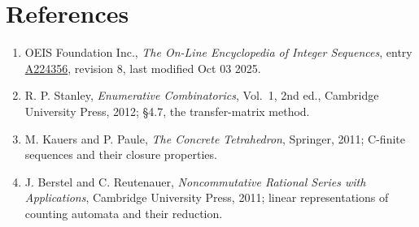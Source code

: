 \documentclass[11pt]{article}
\theoremstyle{definition}
\begin{document}
\section{References}

\begin{enumerate}

\item OEIS Foundation Inc., \emph{The On-Line Encyclopedia of Integer Sequences}, entry \href{https://oeis.org/A224356}{A224356}, revision 8, last modified Oct 03 2025.

\item R. P. Stanley, \emph{Enumerative Combinatorics}, Vol.~1, 2nd ed., Cambridge University Press, 2012; \S4.7, the transfer-matrix method.

\item M. Kauers and P. Paule, \emph{The Concrete Tetrahedron}, Springer, 2011; C-finite sequences and their closure properties.

\item J. Berstel and C. Reutenauer, \emph{Noncommutative Rational Series with Applications}, Cambridge University Press, 2011; linear representations of counting automata and their reduction.

\end{enumerate}
\end{document}
